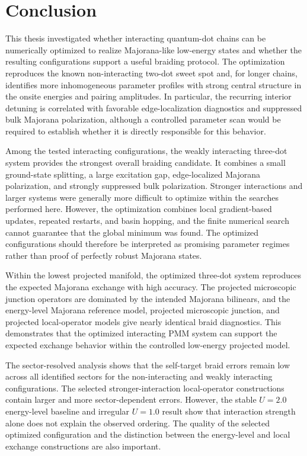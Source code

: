 \chapter{Conclusion}

This thesis investigated whether interacting quantum-dot chains can be numerically optimized to realize Majorana-like low-energy states and whether the resulting configurations support a useful braiding protocol. The optimization reproduces the known non-interacting two-dot sweet spot and, for longer chains, identifies more inhomogeneous parameter profiles with strong central structure in the onsite energies and pairing amplitudes. In particular, the recurring interior detuning is correlated with favorable edge-localization diagnostics and suppressed bulk Majorana polarization, although a controlled parameter scan would be required to establish whether it is directly responsible for this behavior.

Among the tested interacting configurations, the weakly interacting three-dot system provides the strongest overall braiding candidate. It combines a small ground-state splitting, a large excitation gap, edge-localized Majorana polarization, and strongly suppressed bulk polarization. Stronger interactions and larger systems were generally more difficult to optimize within the searches performed here. However, the optimization combines local gradient-based updates, repeated restarts, and basin hopping, and the finite numerical search cannot guarantee that the global minimum was found. The optimized configurations should therefore be interpreted as promising parameter regimes rather than proof of perfectly robust Majorana states.

Within the lowest projected manifold, the optimized three-dot system reproduces the expected Majorana exchange with high accuracy. The projected microscopic junction operators are dominated by the intended Majorana bilinears, and the energy-level Majorana reference model, projected microscopic junction, and projected local-operator models give nearly identical braid diagnostics. This demonstrates that the optimized interacting PMM system can support the expected exchange behavior within the controlled low-energy projected model.

The sector-resolved analysis shows that the self-target braid errors remain low across all identified sectors for the non-interacting and weakly interacting configurations. The selected stronger-interaction local-operator constructions contain larger and more sector-dependent errors. However, the stable $U=2.0$ energy-level baseline and irregular $U=1.0$ result show that interaction strength alone does not explain the observed ordering. The quality of the selected optimized configuration and the distinction between the energy-level and local exchange constructions are also important.

